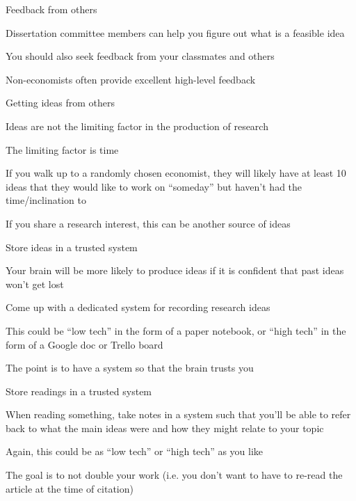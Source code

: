 \documentclass[notes,12pt, aspectratio=169]{beamer}
\newenvironment{wideitemize}{\itemize\addtolength{\itemsep}{15pt}}{\enditemize}
\begin{document}
\begin{frame}{Feedback from others}
\begin{wideitemize}
\item Dissertation committee members can help you figure out what is a feasible idea
\item You should also seek feedback from your classmates and others
\item Non-economists often provide excellent high-level feedback
\end{wideitemize}
\end{frame}


\begin{frame}{Getting ideas from others}
\begin{wideitemize}
\item Ideas are not the limiting factor in the production of research
\item The limiting factor is time
\item If you walk up to a randomly chosen economist, they will likely have at least 10 ideas that they would like to work on ``someday'' but haven't had the time/inclination to
\item If you share a research interest, this can be another source of ideas
\end{wideitemize}
\end{frame}


\begin{frame}{Store ideas in a trusted system}
\begin{wideitemize}
\item Your brain will be more likely to produce ideas if it is confident that past ideas won't get lost
\item Come up with a dedicated system for recording research ideas
\item This could be ``low tech'' in the form of a paper notebook, or ``high tech'' in the form of a Google doc or Trello board
\item The point is to have a system so that the brain trusts you
\end{wideitemize}
\end{frame}


\begin{frame}{Store readings in a trusted system}
\begin{wideitemize}
\item When reading something, take notes in a system such that you'll be able to refer back to what the main ideas were and how they might relate to your topic
\item Again, this could be as ``low tech'' or ``high tech'' as you like
\item The goal is to not double your work (i.e. you don't want to have to re-read the article at the time of citation)
\end{wideitemize}
\end{frame}
\end{document}
